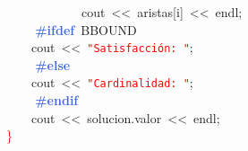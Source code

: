 \mbox{}\ \ \ \ \ \ \ \ \ \ \ \ cout\ \textcolor{BrickRed}{\textless{}\textless{}}\ aristas\textcolor{BrickRed}{[}i\textcolor{BrickRed}{]}\ \textcolor{BrickRed}{\textless{}\textless{}}\ endl\textcolor{BrickRed}{;} \\
\mbox{}\textbf{\textcolor{RoyalBlue}{\ \ \ \ \#ifdef}}\ BBOUND \\
\mbox{}\ \ \ \ cout\ \textcolor{BrickRed}{\textless{}\textless{}}\ \texttt{\textcolor{Red}{"{}Satisfacción:\ "{}}}\textcolor{BrickRed}{;} \\
\mbox{}\textbf{\textcolor{RoyalBlue}{\ \ \ \ \#else}} \\
\mbox{}\ \ \ \ cout\ \textcolor{BrickRed}{\textless{}\textless{}}\ \texttt{\textcolor{Red}{"{}Cardinalidad:\ "{}}}\textcolor{BrickRed}{;} \\
\mbox{}\textbf{\textcolor{RoyalBlue}{\ \ \ \ \#endif}} \\
\mbox{}\ \ \ \ cout\ \textcolor{BrickRed}{\textless{}\textless{}}\ solucion\textcolor{BrickRed}{.}valor\ \textcolor{BrickRed}{\textless{}\textless{}}\ endl\textcolor{BrickRed}{;} \\
\mbox{}\textcolor{Red}{\}} \\
\mbox{}
